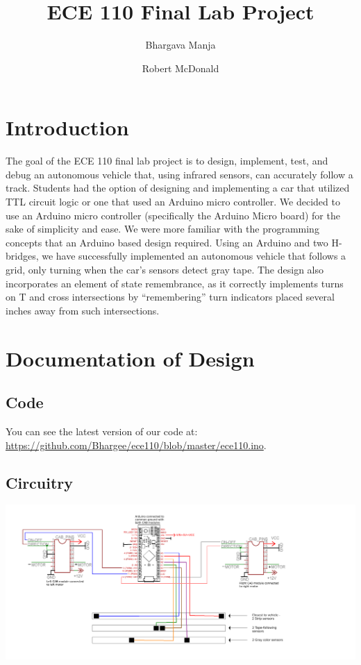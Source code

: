 \documentclass[12pt]{article}
\title{ECE 110 Final Lab Project}
\author{
  Bhargava Manja
  \and
  Robert McDonald
}
\begin{document}
\maketitle

\section{Introduction}
The goal of the ECE 110 final lab project is to design, implement, test, and
debug an autonomous vehicle that, using infrared sensors, can accurately follow
a track. Students had the option of designing and implementing a car that
utilized TTL circuit logic or one that used an Arduino micro controller. We decided to use an Arduino micro controller (specifically the Arduino Micro board) for
the sake of simplicity and ease. We were more familiar with the programming
concepts that an Arduino based design required. Using an Arduino and two H-bridges, we have successfully implemented an autonomous vehicle that follows a grid,
only turning when the car's sensors detect gray tape. The design also incorporates an element of state remembrance, as it correctly implements turns on T and cross intersections by ``remembering'' turn indicators placed several inches away
from such intersections.

\section{Documentation of Design}
\subsection*{Code}
You can see the latest version of our code at: \url{https://github.com/Bhargee/ece110/blob/master/ece110.ino}.
\subsection*{Circuitry}
\includegraphics[scale=.10]{pinout.png}
\end{document}
